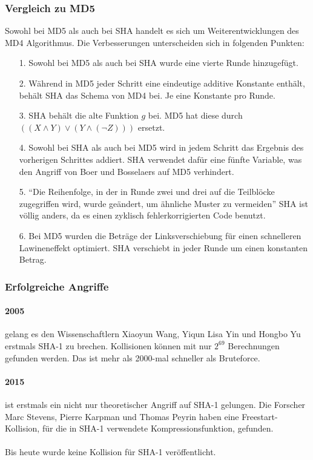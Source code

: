 \documentclass[12pt,a4paper]{scrartcl}
\numberwithin{equation}{section}
\numberwithin{myalgctr}{section}
\numberwithin{mytheoremctr}{section}
\newcommand{\mpar}[1]{\paragraph*{#1}\mbox{}\par}
\begin{document}
	\subsubsection{Vergleich zu MD5}
	Sowohl bei MD5 als auch bei SHA handelt es sich um Weiterentwicklungen des MD4 Algorithmus. Die Verbesserungen unterscheiden sich in folgenden Punkten: \autocite[vgl.][507]{angewandteKryptographie}
	\begin{itemize}
		\item[1.]
		Sowohl bei MD5 als auch bei SHA wurde eine vierte Runde hinzugefügt.
		\item[2.]
		Während in MD5 jeder Schritt eine eindeutige additive Konstante enthält, behält SHA das Schema von MD4 bei. Je eine Konstante pro Runde.
		\item[3.]
		SHA behält die alte Funktion $g$ bei. MD5 hat diese durch $((X\wedge Y)\vee (Y\wedge(\neg Z)))$ ersetzt.
		\item[4.]
		Sowohl bei SHA als auch bei MD5 wird in jedem Schritt das Ergebnis des vorherigen Schrittes addiert. SHA verwendet dafür eine fünfte Variable, was den Angriff von Boer und Bosselaers auf MD5 verhindert.
		\item[5.]
		\textquotedblleft Die Reihenfolge, in der in Runde zwei und drei auf die Teilblöcke zugegriffen wird, wurde geändert, um ähnliche Muster zu vermeiden\textquotedblright{} SHA ist völlig anders, da es einen zyklisch fehlerkorrigierten Code benutzt.\autocite[507]{angewandteKryptographie}
		\item[6.]
		Bei MD5 wurden die Beträge der Linksverschiebung für einen schnelleren Lawineneffekt optimiert. SHA verschiebt in jeder Runde um einen konstanten Betrag.
	\end{itemize}
\subsubsection{Erfolgreiche Angriffe}
	\mpar{2005} gelang es den Wissenschaftlern Xiaoyun Wang, Yiqun Lisa Yin und Hongbo Yu erstmals SHA-1 zu brechen. Kollisionen können mit nur $2^{69}$ Berechnungen gefunden werden. Das ist mehr als 2000-mal schneller als Bruteforce. \autocite[vgl.][]{sha1Broken}
	\mpar{2015} ist erstmals ein nicht nur theoretischer Angriff auf SHA-1 gelungen. Die Forscher Marc Stevens, Pierre Karpman und Thomas Peyrin haben eine Freestart-Kollision, für die in SHA-1 verwendete Kompressionsfunktion, gefunden.\\\autocite[vgl.][]{sha1Collision}\\
	\newline
	Bis heute wurde keine Kollision für SHA-1 veröffentlicht.
	
\end{document}
